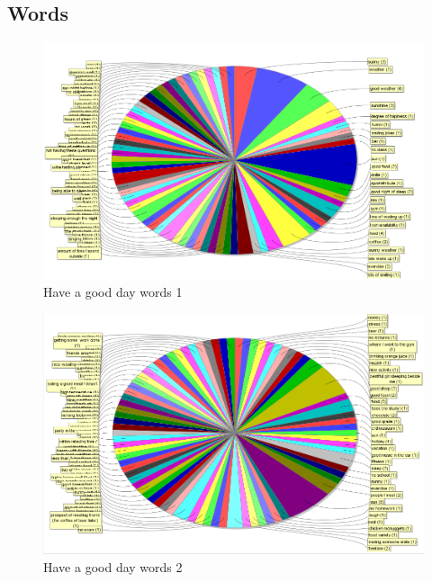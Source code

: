 \documentclass{vldb}
\begin{document}
\begin{appendices}
\section{Words}\label{word}
		\begin{figure}[h]
			\centering
			\includegraphics[scale=0.5]{5.png}
			\caption{Have a good day words 1}
			\label{fig6}
		\end{figure}
		\begin{figure}[h]
			\centering
			\includegraphics[scale=0.5]{6.png}
			\caption{Have a good day words 2}
			\label{fig7}
		\end{figure}
\end{appendices}
\end{document}
